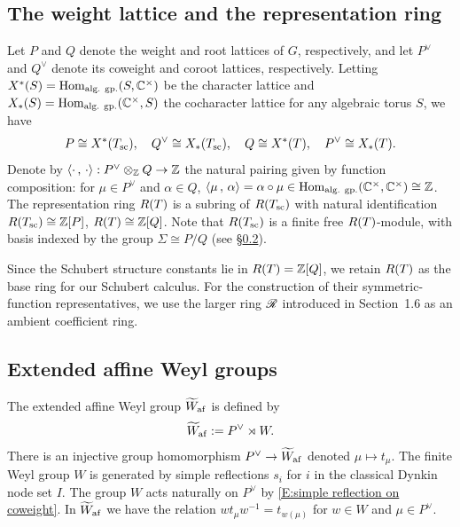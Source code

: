 \documentclass[a4paper]{amsart}
\newcommand{\smark}[1]{\todo[size=\tiny,color=cyan!30]{#1}}
\theoremstyle{remark}
\numberwithin{equation}{section}
\begin{document}


\subsection{The weight lattice and the representation ring}\label{sec:weights}
Let \(P\) and \(Q\) denote the weight and root lattices of $G$, respectively, and let \(P^\lor\) and \(Q^\lor\) denote its coweight and coroot lattices, respectively.
Letting $X^*(S)=\mathrm{Hom}_{\text{alg. gp.}}(S,\mathbb{C}^\times)$ be the character lattice and $X_*(S)=\mathrm{Hom}_{\text{alg. gp.}}(\mathbb{C}^\times,S)$ the cocharacter lattice 
for any algebraic torus $S$, we have
\[
P \cong X^*(T_{\mathrm{sc}}),\quad Q^\lor \cong X_*(T_{\mathrm{sc}}),
\quad
Q\cong X^*(T),\quad P^\lor\cong X_*(T).
\]
{
Denote by $\langle \cdot\,,\,\cdot\rangle: P^\lor \otimes_{\mathbb{Z}} Q \to \mathbb{Z}$ the 
natural pairing given by function composition: for $\mu\in P^\lor$ and $\alpha\in Q$,
$\langle \mu\,,\,\alpha\rangle = \alpha \circ \mu \in \mathrm{Hom}_{\text{alg. gp.}}(\mathbb{C}^\times,\mathbb{C}^\times)\cong \mathbb{Z}$.}
The representation ring $R(T)$ is a subring of 
$R(T_{\mathrm{sc}})$ with natural identification
$R(T_{\mathrm{sc}})\cong\mathbb{Z}[P]$, $R(T)\cong\mathbb{Z}[Q]$. Note that $R(T_{\mathrm{sc}})$ is a finite free $R(T)$-module, with basis
indexed by the group $\Sigma \cong P/Q$ (see \S \ref{SS:extended}).

Since the Schubert structure constants lie in $R(T)=\mathbb{Z}[Q]$,
we retain $R(T)$ as the base ring for our Schubert calculus.
For the construction of their symmetric-function representatives,
we use the larger ring $\mathscr{R}$ introduced in Section~1.6
as an ambient coefficient ring.
\subsection{Extended affine Weyl groups}
\label{SS:extended}
The extended affine Weyl group $\widetilde{W}_{\mathrm{af}}$ is defined by 
\begin{align}\label{E:Wx as Pvee W}
\widetilde{W}_{\mathrm{af}} := P^\lor\rtimes W.
\end{align}
There is an injective group homomorphism $P^\lor \to \widetilde{W}_{\mathrm{af}}$ denoted $\mu\mapsto t_\mu$. 
The finite Weyl group $W$ is generated by simple reflections $s_i$ for $i$ in the classical Dynkin node set $I$. The group $W$ acts naturally on $P^\lor$ by \eqref{E:simple reflection on coweight}. 
In $\widetilde{W}_{\mathrm{af}}$ we have the relation
$w t_\mu w^{-1} = t_{w(\mu)}$ for $w\in W$ and $\mu\in P^\lor$.
\end{document}

